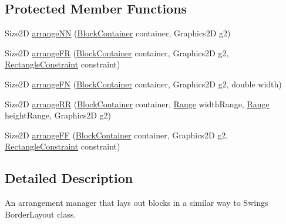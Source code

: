 \subsection*{Protected Member Functions}
\begin{DoxyCompactItemize}
\item 
Size2D \mbox{\hyperlink{classorg_1_1jfree_1_1chart_1_1block_1_1_border_arrangement_ab2870b44ab211b2c44335dcae8f5a20a}{arrange\+NN}} (\mbox{\hyperlink{classorg_1_1jfree_1_1chart_1_1block_1_1_block_container}{Block\+Container}} container, Graphics2D g2)
\item 
Size2D \mbox{\hyperlink{classorg_1_1jfree_1_1chart_1_1block_1_1_border_arrangement_aa58b31eb9be51177f125eb8d34bf86a2}{arrange\+FR}} (\mbox{\hyperlink{classorg_1_1jfree_1_1chart_1_1block_1_1_block_container}{Block\+Container}} container, Graphics2D g2, \mbox{\hyperlink{classorg_1_1jfree_1_1chart_1_1block_1_1_rectangle_constraint}{Rectangle\+Constraint}} constraint)
\item 
Size2D \mbox{\hyperlink{classorg_1_1jfree_1_1chart_1_1block_1_1_border_arrangement_a4d82e993f437fbfda018ddd9b8b84612}{arrange\+FN}} (\mbox{\hyperlink{classorg_1_1jfree_1_1chart_1_1block_1_1_block_container}{Block\+Container}} container, Graphics2D g2, double width)
\item 
Size2D \mbox{\hyperlink{classorg_1_1jfree_1_1chart_1_1block_1_1_border_arrangement_ae1b04632d68adf70b00c345d97658cea}{arrange\+RR}} (\mbox{\hyperlink{classorg_1_1jfree_1_1chart_1_1block_1_1_block_container}{Block\+Container}} container, \mbox{\hyperlink{classorg_1_1jfree_1_1data_1_1_range}{Range}} width\+Range, \mbox{\hyperlink{classorg_1_1jfree_1_1data_1_1_range}{Range}} height\+Range, Graphics2D g2)
\item 
Size2D \mbox{\hyperlink{classorg_1_1jfree_1_1chart_1_1block_1_1_border_arrangement_a1a8ed8d5e87a82e28501808ddff8178f}{arrange\+FF}} (\mbox{\hyperlink{classorg_1_1jfree_1_1chart_1_1block_1_1_block_container}{Block\+Container}} container, Graphics2D g2, \mbox{\hyperlink{classorg_1_1jfree_1_1chart_1_1block_1_1_rectangle_constraint}{Rectangle\+Constraint}} constraint)
\end{DoxyCompactItemize}


\subsection{Detailed Description}
An arrangement manager that lays out blocks in a similar way to Swing\textquotesingle{}s Border\+Layout class. 

